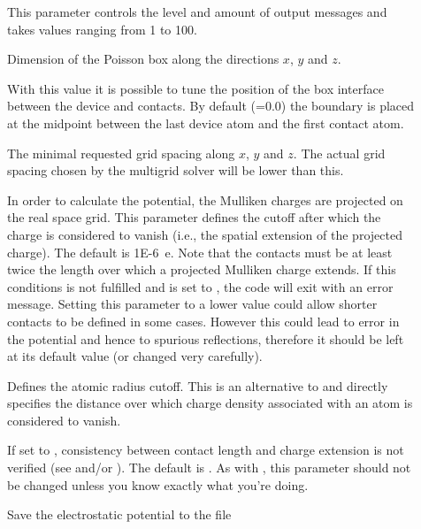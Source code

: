 \begin{description}
\item[] This parameter controls the level and amount of output
  messages and takes values ranging from 1 to 100.
\item[] Dimension of the Poisson box
  along the directions $x$, $y$ and $z$.

  
\item[] With this value it is possible
  to tune the position of the box interface between the device and contacts.  By
  default (=0.0) the boundary is placed at the midpoint between
  the last device atom and the first contact atom.
\item[] The minimal requested grid
  spacing along $x$, $y$ and $z$. The actual grid spacing chosen by the
  multigrid solver will be lower than this.
\item[] In order to calculate the potential, the
  Mulliken charges are projected on the real space grid. This parameter defines
  the cutoff after which the charge is considered to vanish (i.e., the spatial
  extension of the projected charge). The default is 1E-6~e. Note that the
  contacts must be at least twice the length over which a projected Mulliken
  charge extends. If this conditions is not fulfilled and  is
  set to , the code will exit with an error message. Setting this
  parameter to a lower value could allow shorter contacts to be defined in some
  cases. However this could lead to error in the potential and hence to spurious
  reflections, therefore it should be left at its default value (or changed very
  carefully).
\item[] Defines the atomic radius
  cutoff. This is an alternative to  and directly
  specifies the distance over which charge density associated with an atom is
  considered to vanish.
\item[] If set to , consistency between contact length
  and charge extension is not verified (see  and/or
  ). The default is . As with
  , this parameter should not be changed unless you
  know exactly what you're doing.
\item[] Save the electrostatic potential to the file

\end{description}
